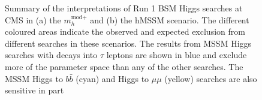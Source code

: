 \begin{figure}[h!]
\begin{center}
\end{center}
\caption{Summary of the interpretations of Run 1 \ac{BSM} Higgs searches at \acs{CMS} in (a) the $m_{h}^{\text{mod+}}$ and (b) the
hMSSM scenario. The different coloured areas indicate the observed and expected exclusion from different searches in these
scenarios. The results from \ac{MSSM} Higgs searches with decays into $\tau$ leptons are shown in blue and exclude more of the parameter
space than any of the other searches. The \ac{MSSM} Higgs to $b\bar{b}$ (cyan) and Higgs to $\mu\mu$ (yellow) searches are also sensitive in part
}
\end{figure}
